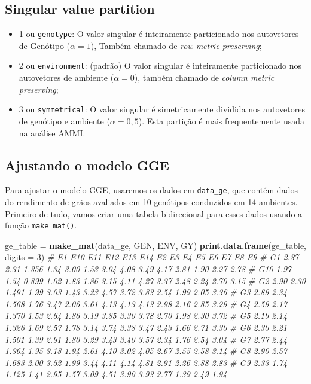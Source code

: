 \documentclass[
]{book}
\makeatletter
\newenvironment{Shaded}{\begin{snugshade}}{\end{snugshade}}
\newcommand{\CommentTok}[1]{\textcolor[rgb]{0.56,0.35,0.01}{\textit{#1}}}
\newcommand{\DataTypeTok}[1]{\textcolor[rgb]{0.13,0.29,0.53}{#1}}
\newcommand{\DecValTok}[1]{\textcolor[rgb]{0.00,0.00,0.81}{#1}}
\newcommand{\KeywordTok}[1]{\textcolor[rgb]{0.13,0.29,0.53}{\textbf{#1}}}
\newcommand{\NormalTok}[1]{#1}
\newcommand{\StringTok}[1]{\textcolor[rgb]{0.31,0.60,0.02}{#1}}
\providecommand{\tightlist}{%
  \setlength{\itemsep}{0pt}\setlength{\parskip}{0pt}}
\numberwithin{equation}{section}
\newcommand{\indf}[1]{\index[function]{#1@\texttt{#1()}|ST}}
\makeatother
\begin{document}
\hypertarget{singular-value-partition}{%
\subsection{Singular value partition}\label{singular-value-partition}}

\indf{gge}

\begin{itemize}
\tightlist
\item
  1 ou \texttt{genotype}: O valor singular é inteiramente particionado nos autovetores de Genótipo (\(\alpha = 1\)), Também chamado de \emph{row metric preserving};
\item
  2 ou \texttt{environment}: (padrão) O valor singular é inteiramente particionado nos autovetores de ambiente (\(\alpha = 0\)), também chamado de \emph{column metric preserving};
\item
  3 ou \texttt{symmetrical}: O valor singular é simetricamente dividida nos autovetores de genótipo e ambiente (\(\alpha = 0,5\)). Esta partição é mais frequentemente usada na análise AMMI.
\end{itemize}

\hypertarget{ajustando-o-modelo-gge}{%
\subsection{Ajustando o modelo GGE}\label{ajustando-o-modelo-gge}}

Para ajustar o modelo GGE, usaremos os dados em \texttt{data\_ge}, que contém dados do rendimento de grãos avaliados em 10 genótipos conduzidos em 14 ambientes. Primeiro de tudo, vamos criar uma tabela bidirecional para esses dados usando a função \texttt{make\_mat()}. \indf{make\_mat}

\begin{Shaded}
\begin{Highlighting}[]
\NormalTok{ge\_table =}\StringTok{ }\KeywordTok{make\_mat}\NormalTok{(data\_ge, GEN, ENV, GY)}
\KeywordTok{print.data.frame}\NormalTok{(ge\_table, }\DataTypeTok{digits =} \DecValTok{3}\NormalTok{)}
\CommentTok{\#       E1  E10   E11  E12  E13  E14   E2   E3   E4   E5   E6   E7   E8   E9}
\CommentTok{\# G1  2.37 2.31 1.356 1.34 3.00 1.53 3.04 4.08 3.49 4.17 2.81 1.90 2.27 2.78}
\CommentTok{\# G10 1.97 1.54 0.899 1.02 1.83 1.86 3.15 4.11 4.27 3.37 2.48 2.24 2.70 3.15}
\CommentTok{\# G2  2.90 2.30 1.491 1.99 3.03 1.43 3.23 4.57 3.72 3.83 2.54 1.99 2.05 3.36}
\CommentTok{\# G3  2.89 2.34 1.568 1.76 3.47 2.06 3.61 4.13 4.13 4.13 2.98 2.16 2.85 3.29}
\CommentTok{\# G4  2.59 2.17 1.370 1.53 2.64 1.86 3.19 3.85 3.30 3.78 2.70 1.98 2.30 3.72}
\CommentTok{\# G5  2.19 2.14 1.326 1.69 2.57 1.78 3.14 3.74 3.38 3.47 2.43 1.66 2.71 3.30}
\CommentTok{\# G6  2.30 2.21 1.501 1.39 2.91 1.80 3.29 3.43 3.40 3.57 2.34 1.76 2.54 3.04}
\CommentTok{\# G7  2.77 2.44 1.364 1.95 3.18 1.94 2.61 4.10 3.02 4.05 2.67 2.55 2.58 3.14}
\CommentTok{\# G8  2.90 2.57 1.683 2.00 3.52 1.99 3.44 4.11 4.14 4.81 2.91 2.26 2.88 2.83}
\CommentTok{\# G9  2.33 1.74 1.125 1.41 2.95 1.57 3.09 4.51 3.90 3.93 2.77 1.39 2.49 1.94}
\end{Highlighting}
\end{Shaded}
\end{document}
